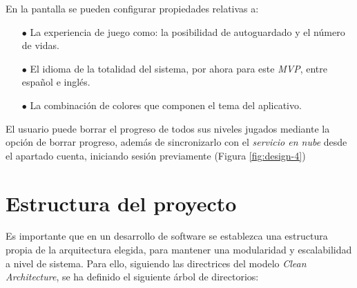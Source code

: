 En la pantalla se pueden configurar propiedades relativas a: 

\begin{itemize}
  \item[$\bullet$] La experiencia de juego como: la posibilidad de autoguardado y
  el número de vidas.
  \item[$\bullet$] El idioma de la totalidad del sistema, por ahora para este \textit{MVP}, entre español e inglés.
  \item[$\bullet$] La combinación de colores que componen el tema del aplicativo.
\end{itemize}

El usuario puede borrar el progreso de todos sus niveles jugados mediante la opción de borrar
progreso, además de sincronizarlo con el \textit{servicio en nube} desde el apartado cuenta, 
iniciando sesión previamente (Figura \ref{fig:design-4})

\section{Estructura del proyecto}
Es importante que en un desarrollo de software se establezca una estructura propia de la arquitectura elegida,
para mantener una modularidad y escalabilidad a nivel de sistema.
Para ello, siguiendo las directrices del modelo \textit{Clean Architecture}, se ha definido el siguiente
árbol de directorios:


